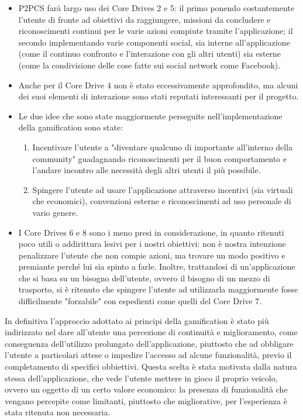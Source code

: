 \begin{itemize}
    \item P2PCS farà largo uso dei Core Drives 2 e 5: il primo ponendo costantemente l'utente di fronte ad obiettivi da raggiungere, missioni da concludere e riconoscimenti continui per le varie azioni compiute tramite l'applicazione; il secondo implementando varie componenti social, sia interne all'applicazione (come il continuo confronto e l'interazione con gli altri utenti) sia esterne (come la condivisione delle cose fatte sui social network come Facebook).
    \item Anche per il Core Drive 4 non è stato eccessivamente approfondito, ma alcuni dei suoi elementi di interazione sono stati reputati interessanti per il progetto.
    \item Le due idee che sono state maggiormente perseguite nell'implementazione della gamification sono state:
    \begin{enumerate}
        \item Incentivare l'utente a "diventare qualcuno di importante all'interno della community" guadagnando riconoscimenti per il buon comportamento e l'andare incontro alle necessità degli altri utenti il più possibile.
        \item Spingere l'utente ad usare l'applicazione attraverso incentivi (sia virtuali che economici), convenzioni esterne e riconoscimenti ad uso personale di vario genere.
    \end{enumerate} 
    \item I Core Drives 6 e 8 sono i meno presi in considerazione, in quanto ritenuti poco utili o addirittura lesivi per i nostri obiettivi: non è nostra intenzione penalizzare l'utente che non compie azioni, ma trovare un modo positivo e premiante perché lui sia spinto a farle. Inoltre, trattandosi di un'applicazione che si basa su un bisogno dell'utente, ovvero il bisogno di un mezzo di trasporto, si è ritenuto che spingere l'utente ad utilizzarla maggiormente fosse difficilmente "forzabile" con espedienti come quelli del Core Drive 7.
\end{itemize}
    In definitiva l'approccio adottato ai principi della gamification è stato più indirizzato nel dare all'utente una percezione di continuità e miglioramento, come conseguenza dell'utilizzo prolungato dell'applicazione, piuttosto che ad obbligare l'utente a particolari attese o impedire l'accesso ad alcune funzionalità, previo il completamento di specifici obbiettivi. Questa scelta è stata motivata dalla natura stessa dell'applicazione, che vede l'utente mettere in gioco il proprio veicolo, ovvero un oggetto di un certo valore economico: la presenza di funzionalità che vengano percepite come limitanti, piuttosto che migliorative, per l'esperienza è stata ritenuta non necessaria.
